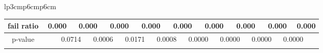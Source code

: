 {\begin{tabular}{lp{3cm}p{6cm}p{6cm}}
\begin{tabular}[h]{m{2.5cm}m{}m{}m{}m{}m{}m{}m{}m{}m{}m{}m{}m{}m{}m{}m{}m{}m{}m{}}
\hline
\multicolumn{1}{c}{fail ratio}&\multicolumn{2}{c}{          0.000}&\multicolumn{2}{c}{    0.000}&\multicolumn{2}{c}{    0.000}&\multicolumn{2}{c}{    0.000}&\multicolumn{2}{c}{    0.000}&\multicolumn{2}{c}{    0.000}&\multicolumn{2}{c}{    0.000}&\multicolumn{2}{c}{    0.000}&\multicolumn{2}{c}{    0.000}\\
\hline
\multicolumn{1}{c}{p-value}&&\multicolumn{2}{c}{0.0714}&\multicolumn{2}{c}{0.0006}&\multicolumn{2}{c}{0.0171}&\multicolumn{2}{c}{0.0008}&\multicolumn{2}{c}{0.0000}&\multicolumn{2}{c}{0.0000}&\multicolumn{2}{c}{0.0000}&\multicolumn{2}{c}{0.0000}\\
&&&&&&&&&&&&&&&&&&\end{tabular}
\end{tabular}
}
